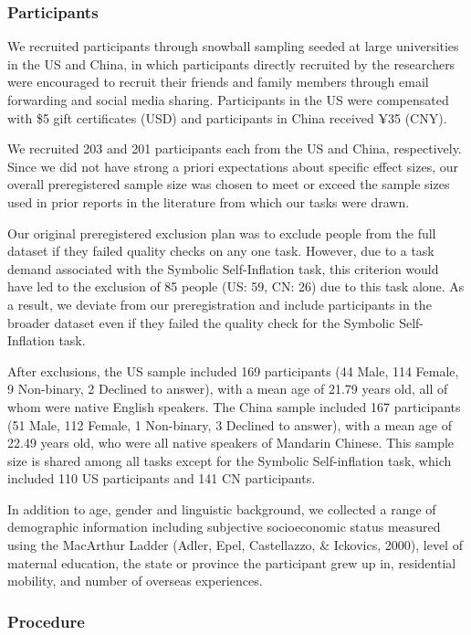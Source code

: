 \documentclass[
  man,floatsintext]{apa6}
\begin{document}
\hypertarget{participants}{%
\subsubsection{Participants}\label{participants}}

We recruited participants through snowball sampling seeded at large universities in the US and China, in which participants directly recruited by the researchers were encouraged to recruit their friends and family members through email forwarding and social media sharing. Participants in the US were compensated with \$5 gift certificates (USD) and participants in China received ¥35 (CNY).

We recruited 203 and 201 participants each from the US and China, respectively. Since we did not have strong a priori expectations about specific effect sizes, our overall preregistered sample size was chosen to meet or exceed the sample sizes used in prior reports in the literature from which our tasks were drawn.

Our original preregistered exclusion plan was to exclude people from the full dataset if they failed quality checks on any one task. However, due to a task demand associated with the Symbolic Self-Inflation task, this criterion would have led to the exclusion of 85 people (US: 59, CN: 26) due to this task alone. As a result, we deviate from our preregistration and include participants in the broader dataset even if they failed the quality check for the Symbolic Self-Inflation task.

After exclusions, the US sample included 169 participants (44 Male, 114 Female, 9 Non-binary, 2 Declined to answer), with a mean age of 21.79 years old, all of whom were native English speakers. The China sample included 167 participants (51 Male, 112 Female, 1 Non-binary, 3 Declined to answer), with a mean age of 22.49 years old, who were all native speakers of Mandarin Chinese. This sample size is shared among all tasks except for the Symbolic Self-inflation task, which included 110 US participants and 141 CN participants.

In addition to age, gender and linguistic background, we collected a range of demographic information including subjective socioeconomic status measured using the MacArthur Ladder (Adler, Epel, Castellazzo, \& Ickovics, 2000), level of maternal education, the state or province the participant grew up in, residential mobility, and number of overseas experiences.

\hypertarget{procedure}{%
\subsubsection{Procedure}\label{procedure}}
\end{document}
